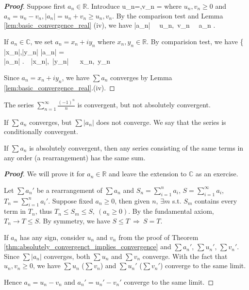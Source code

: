 \begin{proof}[{\bf Proof}]
Suppose first $a_n\in\mathbb{R}$. Introduce 
\be
u_n=,\quad v_n = 
\ee
where $u_n,v_n\geq 0$ and $a_n = u_n - v_n, |a_n| = u_n + v_n\geq u_n,v_n$. By the comparison test and Lemma \ref{lem:basic_convergence_real} (iv), we have 
\be
\sum|a_n|  \ \Rightarrow \ \sum u_n,\ \sum v_n  \ \Rightarrow \ \sum a_n . 
\ee

If $a_n\in\mathbb{C}$, we set $a_n=x_n+iy_n$ where $x_n,y_n\in\mathbb{R}$. By comparision test, we have 
\be
\left\{
|x_n|,|y_n| \leq |a_n| =  \\
\sum|a_n|  \ea \right.\ \ra \ \sum|x_n|,\ \sum|y_n|  \  \ \sum x_n,\ \sum y_n 
\ee

Since $a_n=x_n+iy_n$, we have $\sum a_n $ converges by Lemma \ref{lem:basic_convergence_real}.(iv).
\end{proof}

\begin{example}
The series $\sum^\infty_{n=1}\frac{(-1)^n}{n}$ is convergent, but not absolutely convergent.
\end{example}


\begin{definition}
If $\sum a_n$ converges, but $\sum|a_n|$ does not converge. We say that the series is conditionally convergent.
\end{definition}

\begin{theorem}
If $\sum a_n$ is absolutely convergent, then any series consisting of the same terms in any order (a rearrangement) has the same sum.
\end{theorem}

\begin{proof}[{\bf Proof}]
We will prove it for $a_n\in\mathbb{R}$ and leave the extension to $\mathbb{C}$ as an exercise.

Let $\sum a_n'$ be a rearrangement of $\sum a_n$ and $S_n = \sum^n_{i=1}a_i$, $S = \sum^\infty_{i=1}a_i$, $T_n = \sum^n_{i=1}a_i'$. Suppose fixed $a_n\geq 0$, then given $n$, $\exists m$ s.t. $S_m$ contains every term in $T_n$, thus $T_n\leq S_m \leq S,\ (a_n\geq 0)$. By the fundamental axiom, $T_n\to T\leq S$. By symmetry, we have $S\leq T \ \Rightarrow\ S=T$.

If $a_n$ has any sign, consider $u_n$ and $v_n$ from the proof of Theorem \ref{thm:absolutely_convergenct_implies_convergence} and $\sum a_n'$, $\sum u_n'$, $\sum v_n'$. Since $\sum |a_n|$ converges, both $\sum u_n$ and $\sum v_n$ converge. With the fact that $u_n,v_n\geq 0$, we have $\sum u_n$ ($\sum v_n$) and $\sum u_n'$ ($\sum v_n'$) converge to the same limit. 

Hence $a_n = u_n - v_n$ and $a_n' = u_n' - v_n'$ converge to the same limit.
\end{proof}

